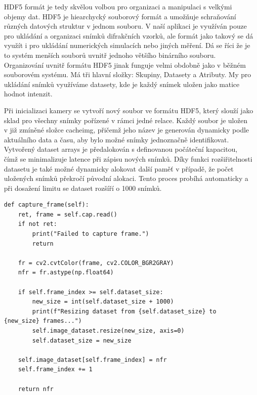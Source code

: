 \documentclass{article}
\begin{document}
HDF5 formát je tedy skvělou volbou pro organizaci a manipulaci s velkými objemy dat. HDF5 je hiearchycký souborový formát a umožňuje schraňování různých datových struktur v jednom souboru. V naší aplikaci je využíván pouze pro ukládání a organizaci snímků difrakčních vzorků, ale formát jako takový se dá využít i pro ukládání numerických simulacích nebo jiných měření. Dá se říci že je to systém menších souborů uvnitř jednoho většího binárního souboru. Organizování uvnitř formátu HDF5 jinak funguje velmi obdobně jako v běžném souborovém systému. Má tři hlavní složky: Skupiny, Datasety a Atributy. My pro ukládání snímků využíváme datasety, kde je každý snímek uložen jako matice hodnot intenzit.

Při inicializaci kamery se vytvoří nový soubor ve formátu HDF5, který slouží jako sklad pro všechny snímky pořízené v rámci jedné relace. Každý soubor je uložen v již zmíněné složce cacheimg, přičemž jeho název je generován dynamicky podle aktuálního data a času, aby bylo možné snímky jednoznačně identifikovat. Vytvořený dataset arrays je předalokován s definovanou počáteční kapacitou, čímž se minimalizuje latence při zápisu nových snímků. Díky funkci rozšiřitelnosti datasetu je také možné dynamicky alokovat další paměť v případě, že počet uložených snímků překročí původní alokaci. Tento proces probíhá automaticky a při dosažení limitu se dataset rozšíří o 1000 snímků.\\

\begin{lstlisting}
def capture_frame(self):
    ret, frame = self.cap.read()
    if not ret:
        print("Failed to capture frame.")
        return

    fr = cv2.cvtColor(frame, cv2.COLOR_BGR2GRAY)
    nfr = fr.astype(np.float64)

    if self.frame_index >= self.dataset_size:
        new_size = int(self.dataset_size + 1000)
        print(f"Resizing dataset from {self.dataset_size} to {new_size} frames...")
        self.image_dataset.resize(new_size, axis=0)
        self.dataset_size = new_size  

    self.image_dataset[self.frame_index] = nfr
    self.frame_index += 1

    return nfr
\end{lstlisting}
\vspace{0.5cm}
\end{document}
